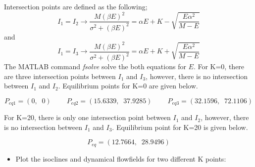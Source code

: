 \documentclass{article}
\begin{document}
Intersection points are defined as the following;
\begin{equation*}
 I_1=I_2\longrightarrow \frac{M(\beta E)^2}{\sigma^2+(\beta E)^2}=\alpha E+K-\sqrt{\frac{E \alpha^2}{M-E}}
\end{equation*}
and
\begin{equation*}
 I_1=I_3\longrightarrow \frac{M(\beta E)^2}{\sigma^2+(\beta E)^2}=\alpha E+K+\sqrt{\frac{E \alpha^2}{M-E}}
\end{equation*}
The MATLAB command \textit{fsolve} solve the both equations for $E$. For K=0, there are three intersection points between $I_1$ and $I_3$, however, there is no intersection between $I_1$ and $I_2$. Equilibrium points for K=0 are given below.

\begin{equation*}
P_{eq1}=(0,\;\;0) \;\;\;\;\;\;\;\; P_{eq2}=(15.6339,\;\;37.9285) \;\;\;\;\;\;\;\;P_{eq3}=(32.1596,\;\; 72.1106) 
\end{equation*}

 For K=20, there is only one intersection point between $I_1$ and $I_2$, however, there is no intersection between $I_1$ and $I_3$. Equilibrium point for K=20 is given below.

 \begin{equation*}
  P_{eq}=(12.7664,\;\;28.9496)
 \end{equation*}


\begin{itemize}
 \item Plot the isoclines and dynamical flowfields for two different K points:
\end{itemize}
\end{document}
